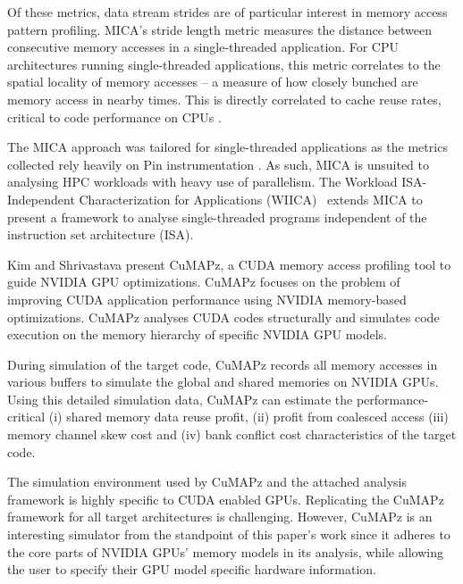\documentclass[review=false, sigchi]{acmart}
\begin{document}
	Of these metrics, data stream strides are of particular interest in memory access pattern profiling.
	MICA's stride length metric measures the distance between consecutive memory accesses in a single-threaded application.
	For CPU architectures running single-threaded applications, this metric correlates to the spatial locality of memory accesses -- a measure of how closely bunched are memory access in nearby times.
	This is directly correlated to cache reuse rates, critical to code performance on CPUs \cite{inteloptimisation}. %
	
	The MICA approach was tailored for single-threaded applications as the metrics collected rely heavily on Pin instrumentation \cite{luk2005pin}.
	As such, MICA is unsuited to analysing HPC workloads with heavy use of parallelism.
	The Workload ISA-Independent Characterization for Applications (WIICA)~\cite{shao2013isa} extends MICA to present a framework to analyse single-threaded programs independent of the instruction set architecture (ISA).

	Kim and Shrivastava \cite{kim2011cumapz} present CuMAPz, a CUDA memory access profiling tool to guide NVIDIA GPU optimizations.
	CuMAPz focuses on the problem of improving CUDA application performance using NVIDIA memory-based optimizations.
	CuMAPz analyses CUDA codes structurally and simulates code execution on the memory hierarchy of specific NVIDIA GPU models.
	
	During simulation of the target code, CuMAPz records all memory accesses in various buffers to simulate the global and shared memories on NVIDIA GPUs.
	Using this detailed simulation data, CuMAPz can estimate the performance-critical (i) shared memory data reuse profit, (ii) profit from coalesced access (iii) memory channel skew cost and (iv) bank conflict cost characteristics of the target code.
	
	The simulation environment used by CuMAPz and the attached analysis framework is highly specific to CUDA enabled GPUs.
	Replicating the CuMAPz framework for all target architectures is challenging.
	However, CuMAPz is an interesting simulator from the standpoint of this paper's work since it adheres to the core parts of NVIDIA GPUs' memory models in its analysis, while allowing the user to specify their GPU model specific hardware information.
	
	
\end{document}
